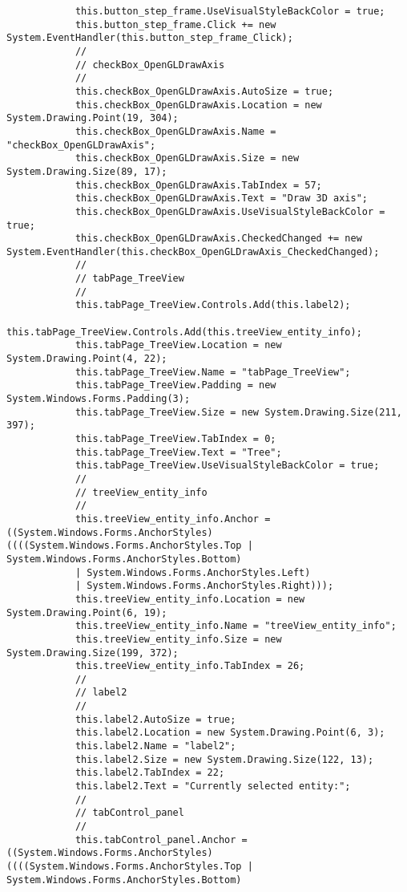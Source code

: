 \begin{scriptsize}
\begin{verbatim}
            this.button_step_frame.UseVisualStyleBackColor = true;
            this.button_step_frame.Click += new System.EventHandler(this.button_step_frame_Click);
            // 
            // checkBox_OpenGLDrawAxis
            // 
            this.checkBox_OpenGLDrawAxis.AutoSize = true;
            this.checkBox_OpenGLDrawAxis.Location = new System.Drawing.Point(19, 304);
            this.checkBox_OpenGLDrawAxis.Name = "checkBox_OpenGLDrawAxis";
            this.checkBox_OpenGLDrawAxis.Size = new System.Drawing.Size(89, 17);
            this.checkBox_OpenGLDrawAxis.TabIndex = 57;
            this.checkBox_OpenGLDrawAxis.Text = "Draw 3D axis";
            this.checkBox_OpenGLDrawAxis.UseVisualStyleBackColor = true;
            this.checkBox_OpenGLDrawAxis.CheckedChanged += new System.EventHandler(this.checkBox_OpenGLDrawAxis_CheckedChanged);
            // 
            // tabPage_TreeView
            // 
            this.tabPage_TreeView.Controls.Add(this.label2);
            this.tabPage_TreeView.Controls.Add(this.treeView_entity_info);
            this.tabPage_TreeView.Location = new System.Drawing.Point(4, 22);
            this.tabPage_TreeView.Name = "tabPage_TreeView";
            this.tabPage_TreeView.Padding = new System.Windows.Forms.Padding(3);
            this.tabPage_TreeView.Size = new System.Drawing.Size(211, 397);
            this.tabPage_TreeView.TabIndex = 0;
            this.tabPage_TreeView.Text = "Tree";
            this.tabPage_TreeView.UseVisualStyleBackColor = true;
            // 
            // treeView_entity_info
            // 
            this.treeView_entity_info.Anchor = ((System.Windows.Forms.AnchorStyles)((((System.Windows.Forms.AnchorStyles.Top | System.Windows.Forms.AnchorStyles.Bottom) 
            | System.Windows.Forms.AnchorStyles.Left) 
            | System.Windows.Forms.AnchorStyles.Right)));
            this.treeView_entity_info.Location = new System.Drawing.Point(6, 19);
            this.treeView_entity_info.Name = "treeView_entity_info";
            this.treeView_entity_info.Size = new System.Drawing.Size(199, 372);
            this.treeView_entity_info.TabIndex = 26;
            // 
            // label2
            // 
            this.label2.AutoSize = true;
            this.label2.Location = new System.Drawing.Point(6, 3);
            this.label2.Name = "label2";
            this.label2.Size = new System.Drawing.Size(122, 13);
            this.label2.TabIndex = 22;
            this.label2.Text = "Currently selected entity:";
            // 
            // tabControl_panel
            // 
            this.tabControl_panel.Anchor = ((System.Windows.Forms.AnchorStyles)((((System.Windows.Forms.AnchorStyles.Top | System.Windows.Forms.AnchorStyles.Bottom) 

\end{verbatim}
\end{scriptsize}
